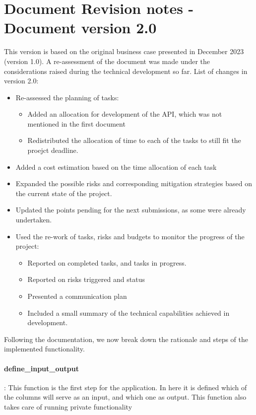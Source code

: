 \documentclass[a4paper, 11pt]{report}
\begin{document}
    \section{Document Revision notes - Document version 2.0}
    This version is based on the original business case presented in December 2023 (version 1.0). A re-assessment of the document was made under the considerations raised during the technical development so far. List of changes in version 2.0:
    \begin{itemize}
        \item Re-assessed the planning of tasks:
        \begin{itemize}
            \item Added an allocation for development of the API, which was not mentioned in the first document
            \item Redistributed the allocation of time to each of the tasks to still fit the proejct deadline.
        \end{itemize}
        \item Added a cost estimation based on the time allocation of each task
        \item Expanded the possible risks and corresponding mitigation strategies based on the current state of the project.
        \item Updated the points pending for the next submissions, as some were already undertaken.
        \item Used the re-work of tasks, risks and budgets to monitor the progress of the project:
        \begin{itemize}
            \item Reported on completed tasks, and tasks in progress.
            \item Reported on risks triggered and status
            \item Presented a communication plan
            \item Included a small summary of the technical capabilities achieved in development.
        \end{itemize}
    \end{itemize}

   Following the documentation, we now break down the rationale and steps of the implemented functionality.

   \paragraph{define\_input\_output}:
   This function is the first step for the application. In here it is defined which of the columns will serve as an input, and which one as output. This function also takes care of running private functionality
\end{document}
